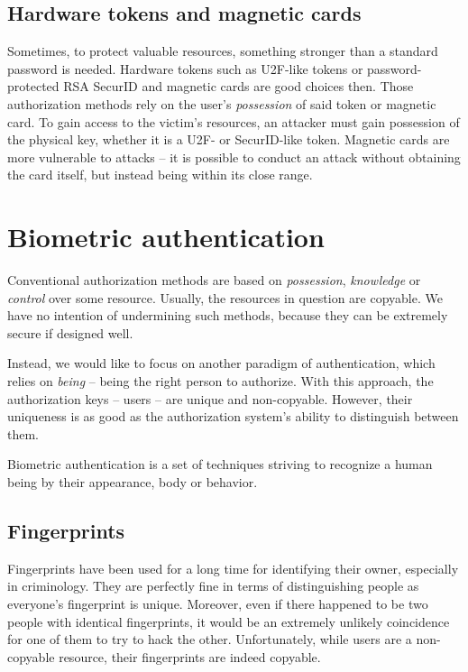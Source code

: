        \subsection*{Hardware tokens and magnetic cards}
            Sometimes, to protect valuable resources,
            something stronger than a standard password is needed.
            Hardware tokens such as U2F-like tokens or password-protected RSA SecurID
            and magnetic cards are good choices then.
            Those authorization methods rely on the user's
            \textit{possession} of said token or magnetic card. To
            gain access to the victim's resources, an attacker must gain
            possession of the physical key, whether it is a U2F- or SecurID-like token.
            Magnetic cards are more vulnerable to attacks -- it is possible to
            conduct an attack without obtaining the card itself, but instead
            being within its close range.

    \section{Biometric authentication}
        Conventional authorization methods are based on \textit{possession},
        \textit{knowledge} or \textit{control} over some resource. Usually, the
        resources in question are copyable.
        We have no intention of undermining such methods, because they can be
        extremely secure if designed well.

        Instead, we would like to focus on another paradigm of authentication,
        which relies on \textit{being} -- being the right person to authorize.
        With this approach, the authorization keys -- users -- are unique and non-copyable. However,
        their uniqueness is as good as the authorization system's ability to
        distinguish between them.

        Biometric authentication is a set of techniques striving to recognize a
        human being by their appearance, body or behavior.

        \subsection*{Fingerprints}
            Fingerprints have been used for a long time for identifying their
            owner, especially in criminology. They are perfectly fine in terms of
            distinguishing people as everyone's fingerprint is unique. Moreover,
            even if there happened to be two people with identical fingerprints,
            it would be an extremely unlikely coincidence for one of them to try
            to hack the other.
            Unfortunately, while users are a non-copyable resource, their fingerprints
            are indeed copyable.


